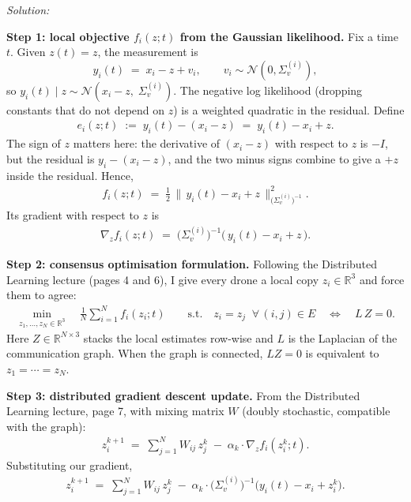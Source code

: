 \documentclass[a4paper, 11pt]{article}
\newenvironment{solution}
    {\textit{Solution:}}
    {}
\begin{document}
\begin{solution}

\textbf{Step 1: local objective $f_i(z;t)$ from the Gaussian likelihood.}
Fix a time $t$. Given $z(t) = z$, the measurement is
\[
    y_i(t) \;=\; x_i - z + v_i, \qquad v_i \sim \mathcal{N}(0, \Sigma_v^{(i)}),
\]
so $y_i(t) \mid z \sim \mathcal{N}(x_i - z,\; \Sigma_v^{(i)})$. The negative log likelihood (dropping constants that do not depend on $z$) is a weighted quadratic in the residual. Define
\begin{align*}
    e_i(z;t) \;:=\; y_i(t) - (x_i - z) \;=\; y_i(t) - x_i + z.
\end{align*}
The sign of $z$ matters here: the derivative of $(x_i - z)$ with respect to $z$ is $-I$, but the residual is $y_i - (x_i - z)$, and the two minus signs combine to give a $+z$ inside the residual. Hence,
\begin{align*}
    \boxed{\; f_i(z;t) \;=\; \tfrac{1}{2}\, \big\|\, y_i(t) - x_i + z\, \big\|^2_{\big(\Sigma_v^{(i)}\big)^{-1}}. \;}
\end{align*}
Its gradient with respect to $z$ is
\begin{align*}
    \nabla_z f_i(z;t) \;=\; \big(\Sigma_v^{(i)}\big)^{-1} \big(\, y_i(t) - x_i + z \,\big).
\end{align*}

\textbf{Step 2: consensus optimisation formulation.} Following the Distributed Learning lecture (pages 4 and 6), I give every drone a local copy $z_i \in \mathbb{R}^3$ and force them to agree:
\begin{align*}
    \min_{z_1, \ldots, z_N \in \mathbb{R}^3} \quad \frac{1}{N}\sum_{i=1}^{N} f_i(z_i; t) \qquad \text{s.t.} \quad z_i = z_j \;\; \forall\, (i,j) \in E \quad \Longleftrightarrow \quad L\, Z = 0.
\end{align*}
Here $Z \in \mathbb{R}^{N \times 3}$ stacks the local estimates row-wise and $L$ is the Laplacian of the communication graph. When the graph is connected, $LZ = 0$ is equivalent to $z_1 = \cdots = z_N$.

\textbf{Step 3: distributed gradient descent update.} From the Distributed Learning lecture, page 7, with mixing matrix $W$ (doubly stochastic, compatible with the graph):
\begin{align*}
    z_i^{k+1} \;=\; \sum_{j=1}^{N} W_{ij}\, z_j^{k} \;-\; \alpha_k \cdot \nabla_z f_i(z_i^k; t).
\end{align*}
Substituting our gradient,
\begin{align*}
    z_i^{k+1} \;=\; \sum_{j=1}^{N} W_{ij}\, z_j^{k} \;-\; \alpha_k \cdot \big(\Sigma_v^{(i)}\big)^{-1} \big(y_i(t) - x_i + z_i^k\big).
\end{align*}


\end{solution}
\end{document}
